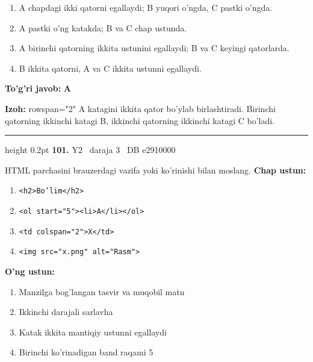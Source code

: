 \documentclass[10pt,a4paper,oneside]{article}
\begin{document}
\begin{enumerate}[label=\Alph*),leftmargin=9mm]
\item A chapdagi ikki qatorni egallaydi; B yuqori o'ngda, C pastki o'ngda.
\item A pastki o'ng katakda; B va C chap ustunda.
\item A birinchi qatorning ikkita ustunini egallaydi; B va C keyingi qatorlarda.
\item B ikkita qatorni, A va C ikkita ustunni egallaydi.
\end{enumerate}
\begin{tcolorbox}[enhanced,breakable,colback=teal!4,colframe=teal!45!black,boxrule=0.45pt,arc=1.2mm,left=2.8mm,right=2.8mm,top=2mm,bottom=2mm,before skip=2mm,after skip=2mm]
\textbf{\color{teal}To'g'ri javob:} \textbf{A}
\par\smallskip
\textbf{Izoh:} rowspan="2" A katagini ikkita qator bo'ylab birlashtiradi. Birinchi qatorning ikkinchi katagi B, ikkinchi qatorning ikkinchi katagi C bo'ladi.
\end{tcolorbox}
\vspace{2mm}\hrule height 0.2pt \vspace{4mm}
\hypertarget{q101}{\textbf{\color{ink}101.}}  {\color{muted}\scriptsize Y2 \textbullet\ daraja 3 \textbullet\ DB e2910000}
\par
HTML parchasini brauzerdagi vazifa yoki ko'rinishi bilan moslang.
\textbf{\footnotesize Chap ustun:}
\begin{enumerate}[label=\arabic*),leftmargin=9mm]
\item \texttt{\textless{}h2\textgreater{}Bo'lim\textless{}/h2\textgreater{}}
\item \texttt{\textless{}ol start="5"\textgreater{}\textless{}li\textgreater{}A\textless{}/li\textgreater{}\textless{}/ol\textgreater{}}
\item \texttt{\textless{}td colspan="2"\textgreater{}X\textless{}/td\textgreater{}}
\item \texttt{\textless{}img src="x.png" alt="Rasm"\textgreater{}}
\end{enumerate}
\textbf{\footnotesize O'ng ustun:}
\begin{enumerate}[label=\Alph*),leftmargin=9mm]
\item Manzilga bog'langan tasvir va muqobil matn
\item Ikkinchi darajali sarlavha
\item Katak ikkita mantiqiy ustunni egallaydi
\item Birinchi ko'rinadigan band raqami 5
\end{enumerate}
\end{document}
